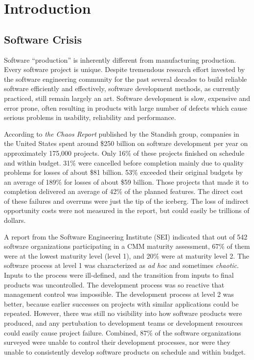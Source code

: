 \chapter{Introduction}
\label{Chapter:Intro}



\section{Software Crisis}  \label{Intro:Crisis}

Software ``production'' is inherently different from manufacturing production. Every software project is unique. Despite tremendous research effort invested by the software engineering community for the past several decades to build reliable software efficiently and effectively, software development methods, as currently practiced, still remain largely an art. Software development is slow, expensive and error prone, often resulting in products with large number of defects which cause serious problems in usability, reliability and performance.

According to \textit{the Chaos Report} \cite{Standish:1994} published by the Standish group, companies in the United States spent around \$250 billion on software development per year on approximately 175,000 projects. Only 16\% of these projects finished on schedule and within budget. 31\% were cancelled before completion mainly due to quality problems for losses of about \$81 billion. 53\% exceeded their original budgets by an average of 189\% for losses of about \$59 billion. Those projects that made it to completion delivered an average of 42\% of the planned features. The direct cost of these failures and overruns were just the tip of the iceberg. The loss of indirect opportunity costs were not measured in the report, but could easily be trillions of dollars.

A report \cite{Peterson:1997} from the Software Engineering Institute (SEI) indicated that out of 542 software organizations participating in a CMM maturity assessment, 67\% of them were at the lowest maturity level (level 1), and 20\% were at maturity level 2. The software process at level 1 was characterized as \textit{ad hoc} and sometimes \textit{chaotic}. Inputs to the process were ill-defined, and the transition from inputs to final products was uncontrolled. The development process was so reactive that management control was impossible. The development process at level 2 was better, because earlier successes on projects with similar applications could be repeated. However, there was still no visibility into how software products were produced, and any pertubation to development teams or development resources could easily cause project failure. Combined, 87\% of the software organizations surveyed were unable to control their development processes, nor were they unable to consistently develop software products on schedule and within budget. 

